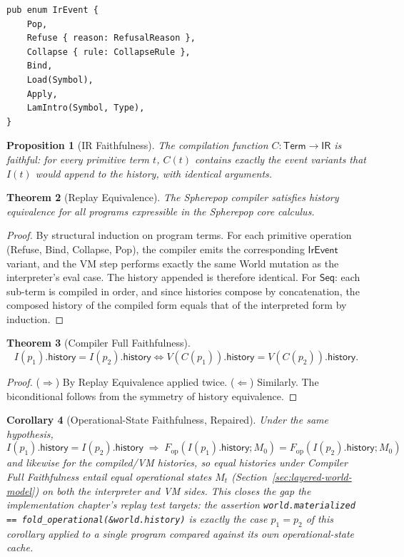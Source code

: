\documentclass[12pt, a4paper, openany]{book}
\theoremstyle{plain}
\newtheorem{theorem}{Theorem}[chapter]
\newtheorem{proposition}[theorem]{Proposition}
\newtheorem{corollary}[theorem]{Corollary}
\theoremstyle{definition}
\theoremstyle{remark}
\begin{document}
\begin{lstlisting}[style=rust, caption={Event IR in Rust}]
pub enum IrEvent {
    Pop,
    Refuse { reason: RefusalReason },
    Collapse { rule: CollapseRule },
    Bind,
    Load(Symbol),
    Apply,
    LamIntro(Symbol, Type),
}
\end{lstlisting}

\begin{proposition}[IR Faithfulness]
The compilation function $C : \mathsf{Term} \to \mathsf{IR}$ is faithful: for
every primitive term $t$, $C(t)$ contains exactly the event variants that $I(t)$
would append to the history, with identical arguments.
\end{proposition}

\begin{theorem}[Replay Equivalence]
The Spherepop compiler satisfies history equivalence for all programs expressible
in the Spherepop core calculus.
\end{theorem}

\begin{proof}
By structural induction on program terms. For each primitive operation (Refuse,
Bind, Collapse, Pop), the compiler emits the corresponding $\mathsf{IrEvent}$
variant, and the VM step performs exactly the same World mutation as the
interpreter's eval case. The history appended is therefore identical. For $\mathsf{Seq}$:
each sub-term is compiled in order, and since histories compose by concatenation,
the composed history of the compiled form equals that of the interpreted form by
induction.
\end{proof}

\begin{theorem}[Compiler Full Faithfulness]
\[
I(p_1).\mathsf{history} = I(p_2).\mathsf{history}
\iff
V(C(p_1)).\mathsf{history} = V(C(p_2)).\mathsf{history}.
\]
\end{theorem}

\begin{proof}
($\Rightarrow$) By Replay Equivalence applied twice. ($\Leftarrow$) Similarly.
The biconditional follows from the symmetry of history equivalence.
\end{proof}

\begin{corollary}[Operational-State Faithfulness, Repaired]
\label{cor:op-state-faithfulness}
Under the same hypothesis,
\[
I(p_1).\mathsf{history} = I(p_2).\mathsf{history}
\;\Longrightarrow\;
F_{\mathrm{op}}(I(p_1).\mathsf{history}; M_0) = F_{\mathrm{op}}(I(p_2).\mathsf{history}; M_0)
\]
and likewise for the compiled/VM histories, so equal histories under
Compiler Full Faithfulness entail equal operational states $M_t$
(Section~\ref{sec:layered-world-model}) on both the interpreter and VM sides.
This closes the gap the implementation chapter's replay test targets: the
assertion \texttt{world.materialized == fold\_operational(\&world.history)}
is exactly the case $p_1 = p_2$ of this corollary applied to a single program
compared against its own operational-state cache.
\end{corollary}
\end{document}
